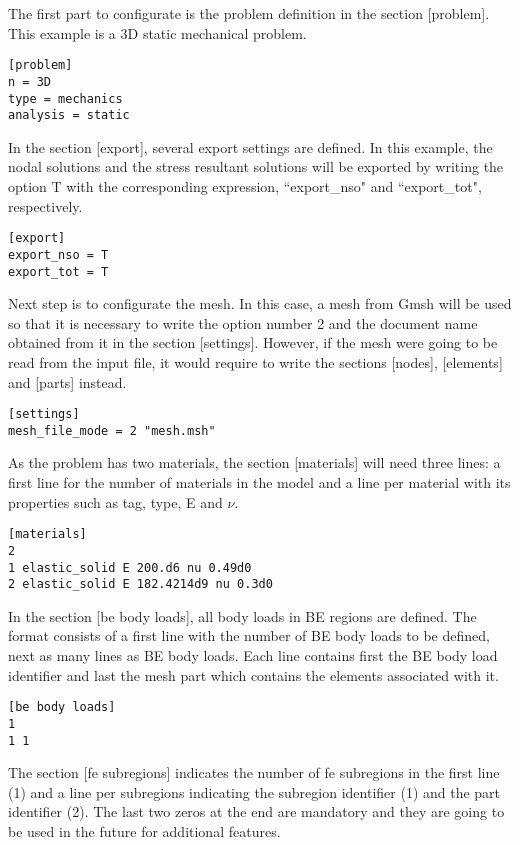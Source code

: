 \documentclass[a4]{article}
\begin{document}
The first part to configurate is the problem definition in the section [problem]. This example is a 3D static mechanical problem.

\begin{Verbatim}	
[problem]
n = 3D
type = mechanics
analysis = static
\end{Verbatim}

In the section [export], several export settings are defined. In this example, the nodal solutions and the stress resultant solutions will be exported by writing the option T with the corresponding expression, ``export\_nso" and ``export\_tot", respectively.

\begin{Verbatim}
[export]
export_nso = T
export_tot = T
\end{Verbatim}

Next step is to configurate the mesh. In this case, a mesh from Gmsh will be used so that it is necessary to write the option number 2 and the document name obtained from it in the section [settings]. However, if the mesh were going to be read from the input file, it would require to write the sections [nodes], [elements] and [parts] instead.

\begin{Verbatim}	
[settings]
mesh_file_mode = 2 "mesh.msh"
\end{Verbatim}

As the problem has two materials, the section [materials] will need three lines: a first line for the number of materials in the model and a line per material with its properties such as tag, type, E and $\nu$.

\begin{Verbatim}
[materials]
2
1 elastic_solid E 200.d6 nu 0.49d0
2 elastic_solid E 182.4214d9 nu 0.3d0
\end{Verbatim}

In the section [be body loads], all body loads in BE regions are defined. The format consists of a first line with the number of BE body loads to be defined, next as many lines as BE body loads. Each line contains first the BE body load identifier and last the mesh part which contains the elements associated with it.

\begin{Verbatim}
[be body loads]
1
1 1
\end{Verbatim}

The section [fe subregions] indicates the number of fe subregions in the first line (1) and a line per subregions indicating the subregion identifier (1) and the part identifier (2). The last two zeros at the end are mandatory and they are going to be used in the future for additional features.
\end{document}
